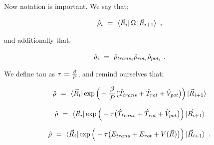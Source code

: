 \documentclass{article}
\begin{document}
Now notation is important. We say that;

\begin{equation} \label{eb-eq-1-236}
\hat{\rho}_i \hspace{0.125cm} = \hspace{0.125cm} \bra{\vec{R}_i} \Omega \ket{\vec{R}_{i+1}} \hspace{0.125cm} , 
\end{equation}

and additionally that;

\begin{equation} \label{eb-eq-1-237}
\hat{\rho}_i \hspace{0.125cm} = \hspace{0.125cm} \hat{\rho}_{trans_i} \hat{\rho}_{rot_i} \hat{\rho}_{pot_i} \hspace{0.125cm} .
\end{equation}

We define tau as \begin{math} \tau \hspace{0.025cm} = \hspace{0.025cm} \frac{\beta}{P} \end{math}, and remind ourselves that;

\begin{equation} \label{eb-eq-1-238}
\hat{\rho} \hspace{0.125cm} = \hspace{0.125cm} \bra{\vec{R}_i} \exp \Big( - \frac{\beta}{P} \big( \hat{T}_{trans} + \hat{T}_{rot} + \hat{V}_{pot} \big) \Big) \ket{\vec{R}_{i+1}}
\end{equation}

\begin{equation} \label{eb-eq-1-239}
\hat{\rho} \hspace{0.125cm} = \hspace{0.125cm} \bra{\vec{R}_i} \exp \Big( - \tau \big( \hat{T}_{trans} + \hat{T}_{rot} + \hat{V}_{pot} \big) \Big) \ket{\vec{R}_{i+1}}
\end{equation}

\begin{equation} \label{eb-eq-1-240}
\hat{\rho} \hspace{0.125cm} = \hspace{0.125cm} \bra{\vec{R}_i} \exp \Big( - \tau \big( E_{trans} + E_{rot} + V(\vec{R})\big) \Big) \ket{\vec{R}_{i+1}} \hspace{0.125cm} .
\end{equation}
\end{document}
